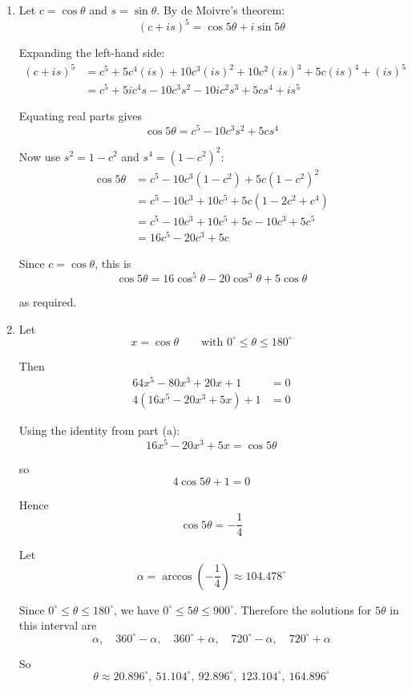 \documentclass[leqno]{article}
\begin{document}
\begin{enumerate}[
  label=\textbf{\arabic*.},
  leftmargin=*,
  topsep=0pt,
  partopsep=0pt,
  parsep=0pt
]
\vspace*{10pt}

\begin{djsSolution}
\begin{enumerate}[label=\textbf{(\alph*)}]
  \item Let \(c=\cos\theta\) and \(s=\sin\theta\). By de Moivre's theorem:
\[
(c+is)^5=\cos5\theta+i\sin5\theta
\]

Expanding the left-hand side:
\begin{align*}
(c+is)^5
&=c^5+5c^4(is)+10c^3(is)^2+10c^2(is)^3+5c(is)^4+(is)^5\\
&=c^5+5ic^4s-10c^3s^2-10ic^2s^3+5cs^4+is^5
\end{align*}

Equating real parts gives
\[
\cos5\theta=c^5-10c^3s^2+5cs^4
\]

Now use \(s^2=1-c^2\) and \(s^4=(1-c^2)^2\):
\begin{align*}
\cos5\theta
&=c^5-10c^3(1-c^2)+5c(1-c^2)^2\\
&=c^5-10c^3+10c^5+5c(1-2c^2+c^4)\\
&=c^5-10c^3+10c^5+5c-10c^3+5c^5\\
&=16c^5-20c^3+5c
\end{align*}

Since \(c=\cos\theta\), this is
\[
\cos5\theta=16\cos^5\theta-20\cos^3\theta+5\cos\theta
\]

as required.

  \item Let
\[
x=\cos\theta \qquad \text{with } 0^\circ\le \theta \le 180^\circ
\]

Then
\begin{align*}
64x^5-80x^3+20x+1&=0\\
4(16x^5-20x^3+5x)+1&=0
\end{align*}

Using the identity from part (a):
\[
16x^5-20x^3+5x=\cos5\theta
\]

so
\[
4\cos5\theta+1=0
\]

Hence
\[
\cos5\theta=-\frac14
\]

Let
\[
\alpha=\arccos\left(-\frac14\right)\approx 104.478^\circ
\]

Since \(0^\circ\le \theta \le 180^\circ\), we have \(0^\circ\le 5\theta \le 900^\circ\). Therefore the solutions for \(5\theta\) in this interval are
\[
\alpha,\quad 360^\circ-\alpha,\quad 360^\circ+\alpha,\quad 720^\circ-\alpha,\quad 720^\circ+\alpha
\]

So
\[
\theta\approx 20.896^\circ,\ 51.104^\circ,\ 92.896^\circ,\ 123.104^\circ,\ 164.896^\circ
\]


\end{enumerate}
\end{djsSolution}
\end{enumerate}
\end{document}
